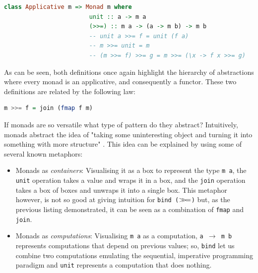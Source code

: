 \documentclass[
  oneside,
  11pt, a4paper,
  footinclude=true,
  headinclude=true,
  cleardoublepage=empty
]{scrbook}
\theoremstyle{definition}
\theoremstyle{definition}
\def\bind{\mathbin{{>\hskip-1ex>\hskip-.4ex=}}}
\begin{document}
	            \begin{lstlisting}[language=Haskell, caption={Monad laws and definition in terms of \texttt{unit} and \texttt{bind}},captionpos=b]
	                class Applicative m => Monad m where
	                    unit :: a -> m a
	                    (>>=) :: m a -> (a -> m b) -> m b
	                    -- unit a >>= f = unit (f a)
	                    -- m >>= unit = m
	                    -- (m >>= f) >>= g = m >>= (\x -> f x >>= g)
	            \end{lstlisting}{}
	            
	            As can be seen, both definitions once again highlight the hierarchy of abstractions where every monad is an applicative, and consequently a functor. These two definitions are related by the following law:
	            
	            \begin{lstlisting}[language=Haskell, caption={Relation between \texttt{join} and \texttt{bind}},captionpos=b]
	                    m >>= f = join (fmap f m) 
	            \end{lstlisting}{}
	            
	            If monads are so versatile what type of pattern do they abstract? Intuitively, monads abstract the idea of "taking some uninteresting object and turning it into something with more structure" \citep{DBLP:journals/corr/abs-1803-10195}. This idea can be explained by using some of several known metaphors:
	            
	            \begin{itemize}
	                \item Monads as \emph{containers}: Visualising it as a box to represent the type \texttt{m a}, the \texttt{unit} operation takes a value and wraps it in a box, and the \texttt{join} operation takes a box of boxes and unwraps it into a single box. This metaphor however, is not so good at giving intuition for \texttt{bind ($\bind$)} but, as the previous listing demonstrated, it can be seen as a combination of \texttt{fmap} and \texttt{join}.
	                
	                \item Monads as \emph{computations}: Visualising \texttt{m a} as a computation, \texttt{a $\rightarrow$ m b} represents computations that depend on previous values; so, \texttt{bind} let us combine two computations emulating the sequential, imperative programming paradigm and \texttt{unit} represents a computation that does nothing.
	            \end{itemize}{}
	            
\end{document}
